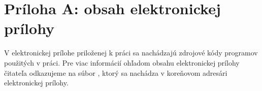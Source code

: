 \chapter*{Príloha A: obsah elektronickej prílohy}

V elektronickej prílohe priloženej k práci sa nachádzajú zdrojové kódy programov použitých v práci. Pre viac informácií ohľadom obsahu elektronickej prílohy čitateľa odkazujeme na súbor , ktorý sa nachádza v koreňovom adresári elektronickej prílohy.
